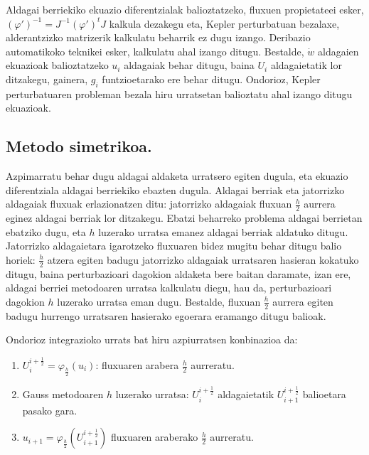 Aldagai berriekiko ekuazio diferentzialak balioztatzeko, fluxuen propietateei esker,$(\varphi')^{-1}=J^{-1}(\varphi')^tJ$ kalkula dezakegu eta, Kepler perturbatuan bezalaxe, alderantzizko matrizerik kalkulatu beharrik ez dugu izango. Deribazio automatikoko teknikei esker, kalkulatu ahal izango ditugu. Bestalde, $\dot{w}$ aldagaien ekuazioak balioztatzeko $u_i$ aldagaiak behar ditugu, baina $U_i$ aldagaietatik lor ditzakegu, gainera, $g_i$ funtzioetarako ere behar ditugu. Ondorioz, Kepler perturbatuaren probleman bezala hiru urratsetan balioztatu ahal izango ditugu ekuazioak.



\subsection*{Metodo simetrikoa.}

Azpimarratu behar dugu aldagai aldaketa urratsero egiten dugula, eta ekuazio diferentziala aldagai berriekiko ebazten dugula. Aldagai berriak eta jatorrizko aldagaiak fluxuak erlazionatzen ditu: jatorrizko aldagaiak fluxuan $\frac{h}{2}$ aurrera eginez aldagai berriak lor ditzakegu. Ebatzi beharreko problema aldagai berrietan ebatziko dugu, eta $h$ luzerako urratsa emanez aldagai berriak aldatuko ditugu. Jatorrizko aldagaietara igarotzeko fluxuaren bidez mugitu behar ditugu balio horiek: $\frac{h}{2}$ atzera egiten badugu jatorrizko aldagaiak urratsaren hasieran kokatuko ditugu, baina perturbazioari dagokion aldaketa bere baitan daramate, izan ere, aldagai berriei metodoaren urratsa kalkulatu diegu, hau da, perturbazioari dagokion $h$ luzerako urratsa eman dugu. Bestalde, fluxuan $\frac{h}{2}$ aurrera egiten badugu hurrengo urratsaren hasierako egoerara eramango ditugu balioak.

Ondorioz integrazioko urrats bat hiru azpiurratsen konbinazioa da:
\begin{enumerate}
\item $U_i^{i+\frac{1}{2}}=\varphi_{\frac{h}{2}}(u_i)$: fluxuaren arabera $\frac{h}{2}$ aurreratu.
\item Gauss metodoaren $h$ luzerako urratsa: $U_i^{i+\frac{1}{2}}$ aldagaietatik  $U_{i+1}^{i+\frac{1}{2}}$ balioetara pasako gara.
\item $u_{i+1}=\varphi_{\frac{h}{2}}(U_{i+1}^{i+\frac{1}{2}})$ fluxuaren araberako $\frac{h}{2}$ aurreratu.
\end{enumerate}

